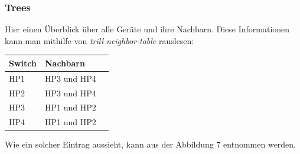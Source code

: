 \documentclass[a4,12pt]{scrartcl}
\begin{document}
\subsubsection{Trees}
Hier einen Überblick über alle Geräte und ihre Nachbarn. Diese Informationen kann man mithilfe von \textit{trill neighbor-table} rauslesen: 
\begin{center}
    \begin{tabular}{@{} l l r@{}}\toprule    
    {Switch} & {Nachbarn}\\ \midrule
    HP1 & HP3 und HP4\\ \addlinespace
    HP2 & HP3 und HP4\\ \addlinespace
    HP3 & HP1 und HP2\\ \addlinespace
    HP4 & HP1 und HP2\\ 
    \bottomrule
    \end{tabular}
\end{center}
Wie ein solcher Eintrag aussieht, kann aus der Abbildung 7 entnommen werden. 
\newpage
\end{document}
